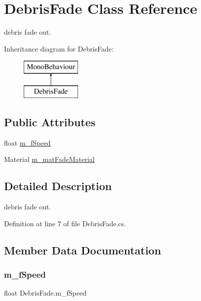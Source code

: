 \hypertarget{class_debris_fade}{}\section{Debris\+Fade Class Reference}
\label{class_debris_fade}


debris fade out.  


Inheritance diagram for Debris\+Fade\+:\begin{figure}[H]
\begin{center}
\leavevmode
\includegraphics[height=2.000000cm]{class_debris_fade}
\end{center}
\end{figure}
\subsection*{Public Attributes}
\begin{DoxyCompactItemize}
\item 
float \mbox{\hyperlink{class_debris_fade_ab6680c9c52f23bd1766163fd28417751}{m\+\_\+f\+Speed}}
\item 
Material \mbox{\hyperlink{class_debris_fade_a66049dffe4d626f08481ccb2dadc8256}{m\+\_\+mat\+Fade\+Material}}
\end{DoxyCompactItemize}


\subsection{Detailed Description}
debris fade out. 



Definition at line 7 of file Debris\+Fade.\+cs.



\subsection{Member Data Documentation}
\mbox{\label{class_debris_fade_ab6680c9c52f23bd1766163fd28417751}} 
\subsubsection{\texorpdfstring{m\+\_\+f\+Speed}{m\_fSpeed}}
{\footnotesize\ttfamily float Debris\+Fade.\+m\+\_\+f\+Speed}



